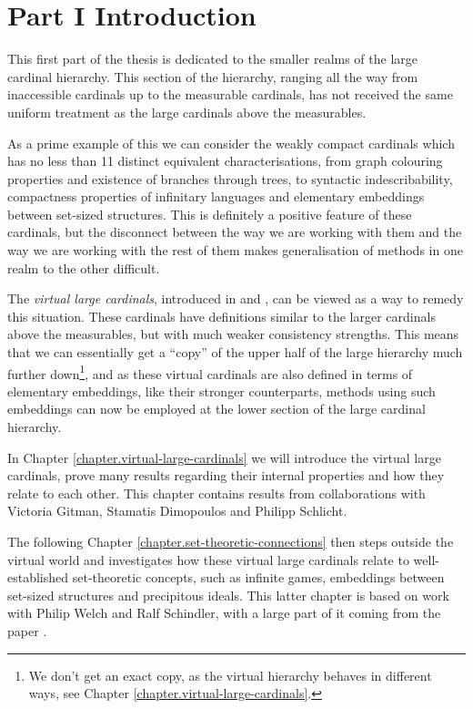 \documentclass[../../main]{subfiles}
\begin{document}
\chapter{Part I Introduction}
\thispagestyle{fancy}

This first part of the thesis is dedicated to the smaller realms of the large cardinal hierarchy. This section of the hierarchy, ranging all the way from inaccessible cardinals up to the measurable cardinals, has not received the same uniform treatment as the large cardinals above the measurables. 

\qquad As a prime example of this we can consider the weakly compact cardinals which has no less than 11 distinct equivalent characterisations, from graph colouring properties and existence of branches through trees, to syntactic indescribability, compactness properties of infinitary languages and elementary embeddings between set-sized structures. This is definitely a positive feature of these cardinals, but the disconnect between the way we are working with them and the way we are working with the rest of them makes generalisation of methods in one realm to the other difficult.

\qquad The \textit{virtual large cardinals}, introduced in \cite{remarkable} and \cite{GitmanSchindler}, can be viewed as a way to remedy this situation. These cardinals have definitions similar to the larger cardinals above the measurables, but with much weaker consistency strengths. This means that we can essentially get a ``copy'' of the upper half of the large hierarchy much further down\footnote{We don't get an exact copy, as the virtual hierarchy behaves in different ways, see Chapter \ref{chapter.virtual-large-cardinals}.}, and as these virtual cardinals are also defined in terms of elementary embeddings, like their stronger counterparts, methods using such embeddings can now be employed at the lower section of the large cardinal hierarchy.

\qquad In Chapter \ref{chapter.virtual-large-cardinals} we will introduce the virtual large cardinals, prove many results regarding their internal properties and how they relate to each other. This chapter contains results from collaborations with Victoria Gitman, Stamatis Dimopoulos and Philipp Schlicht.

\qquad The following Chapter \ref{chapter.set-theoretic-connections} then steps outside the virtual world and investigates how these virtual large cardinals relate to well-established set-theoretic concepts, such as infinite games, embeddings between set-sized structures and precipitous ideals. This latter chapter is based on work with Philip Welch and Ralf Schindler, with a large part of it coming from the paper \cite{NielsenWelch}.
\end{document}
